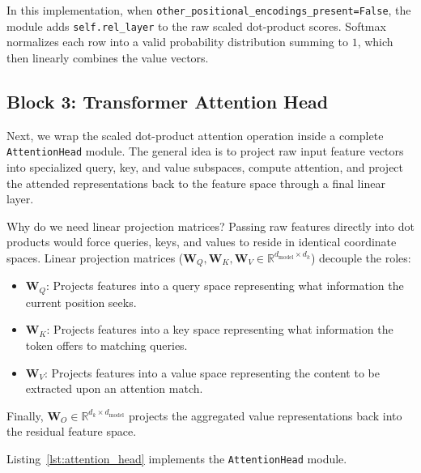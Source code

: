 \documentclass[11pt,a4paper]{article}
\begin{document}
In this implementation, when \texttt{other\_positional\_encodings\_present=False}, the module adds \texttt{self.rel\_layer} to the raw scaled dot-product scores. Softmax normalizes each row into a valid probability distribution summing to $1$, which then linearly combines the value vectors.

\subsection{Block 3: Transformer Attention Head}

Next, we wrap the scaled dot-product attention operation inside a complete \texttt{AttentionHead} module. The general idea is to project raw input feature vectors into specialized query, key, and value subspaces, compute attention, and project the attended representations back to the feature space through a final linear layer.

Why do we need linear projection matrices? Passing raw features directly into dot products would force queries, keys, and values to reside in identical coordinate spaces. Linear projection matrices ($\mathbf{W}_Q, \mathbf{W}_K, \mathbf{W}_V \in \mathbb{R}^{d_{\text{model}} \times d_k}$) decouple the roles:
\begin{itemize}
    \item $\mathbf{W}_Q$: Projects features into a query space representing what information the current position seeks.
    \item $\mathbf{W}_K$: Projects features into a key space representing what information the token offers to matching queries.
    \item $\mathbf{W}_V$: Projects features into a value space representing the content to be extracted upon an attention match.
\end{itemize}
Finally, $\mathbf{W}_O \in \mathbb{R}^{d_k \times d_{\text{model}}}$ projects the aggregated value representations back into the residual feature space.

Listing~\ref{lst:attention_head} implements the \texttt{AttentionHead} module.
\end{document}
